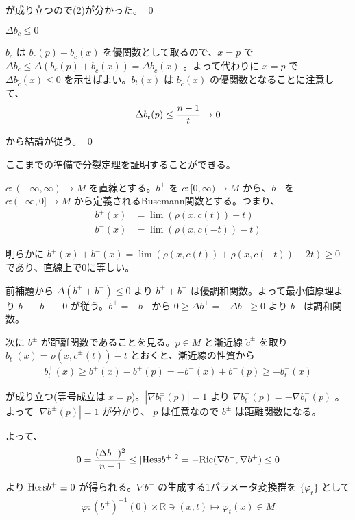 \documentclass[dvipdfmx,a4paper]{jsreport}
\theoremstyle{definition}
\renewcommand{\tilde}{\widetilde}
\newcommand{\Ric}{{\rm Ric}}
\newcommand{\Hess}{{\rm Hess}}
\renewcommand{\phi}{\varphi}
\newcommand{\R}{\mathbb{R}}
\begin{document}
が成り立つので(2)が分かった。 \qed

\lem $\Delta b_c \leq 0$ 

\prf $b_c$ は $b_c(p)+b_{\tilde{c}}(x)$ を優関数として取るので、$x=p$ で $\Delta b_c \leq \Delta (b_c(p)+b_{\tilde{c}}(x))=\Delta b_{\tilde{c}}(x)$ 。よって代わりに $x=p$ で $\Delta b_{\tilde{c}}(x) \leq 0$ を示せばよい。$b_t(x)$ は $b_{\tilde{c}}(x)$ の優関数となることに注意して、
\begin{align*}
    \Delta b_t(p) \leq {n-1 \over t} \to 0
\end{align*}

から結論が従う。 \qed

ここまでの準備で分裂定理を証明することができる。

\prf $c:(-\infty,\infty) \to M$ を直線とする。$b^+$ を $c:[0,\infty) \to M$ から、$b^-$ を $c:(-\infty,0] \to M$ から定義されるBusemann関数とする。つまり、
\begin{align*}
    b^+(x) &= \lim (\rho(x,c(t))-t) \\
    b^-(x) &= \lim (\rho(x,c(-t))-t)
\end{align*}

明らかに $b^+(x)+b^-(x)=\lim (\rho(x,c(t))+\rho(x,c(-t))-2t) \geq 0$ であり、直線上で0に等しい。

前補題から $\Delta(b^+ +b^-) \leq 0$ より $b^+ + b^-$ は優調和関数。よって最小値原理より $b^++b^- \equiv 0$ が従う。$b^+=-b^-$ から $0 \geq \Delta b^+=-\Delta b^- \geq 0$ より $b^{\pm}$ は調和関数。

次に $b^{\pm}$ が距離関数であることを見る。$p \in M$ と漸近線 $\tilde{c}^{\pm}$ を取り $b_t^{\pm}(x)=\rho(x,\tilde{c}^{\pm}(t))-t$ とおくと、漸近線の性質から
\begin{align*}
    b_t^+(x) \geq b^+(x)-b^+(p)=-b^-(x)+b^-(p) \geq -b^-_t(x)
\end{align*}

が成り立つ(等号成立は $x=p$)。$|\nabla b_t^{\pm}(p)|=1$ より $\nabla b_t^+(p)=-\nabla b_t^-(p)$ 。よって $|\nabla b^{\pm}(p)|=1$ が分かり、 $p$ は任意なので $b^{\pm}$ は距離関数になる。

よって、
\begin{align*}
    0={(\Delta b^+)^2 \over n-1} \leq |\Hess b^+|^2=-\Ric(\nabla b^+,\nabla b^+) \leq 0
\end{align*}

より $\Hess b^+ \equiv 0$ が得られる。$\nabla b^+$ の生成する1パラメータ変換群を $\{\phi_t\}$ として
\begin{align*}
    \phi:(b^+)^{-1}(0) \times \R \ni (x,t) \mapsto \phi_t(x) \in M
\end{align*}
\end{document}
